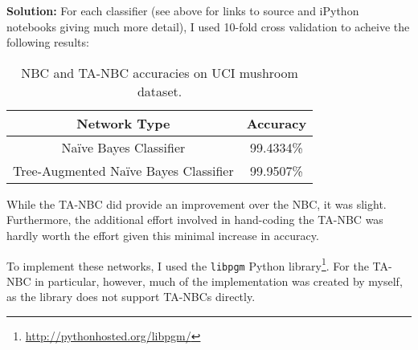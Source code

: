 \documentclass[11pt]{article}
\begin{document}
\begin{enumerate}
\textbf{Solution:} For each classifier (see above for links to source and iPython notebooks giving much more detail), I used 10-fold cross validation to acheive the following results:

\begin{table}[h]
\centering
\begin{tabular}{c|c}
Network Type & Accuracy \\
\hline
Na\"ive Bayes Classifier & 99.4334\% \\
Tree-Augmented Na\"ive Bayes Classifier & 99.9507\% \\
\end{tabular}
\caption{NBC and TA-NBC accuracies on UCI mushroom dataset.}
\label{fig:possible}
\end{table}

While the TA-NBC did provide an improvement over the NBC, it was slight. Furthermore, the additional effort involved in hand-coding the TA-NBC was hardly worth the effort given this minimal increase in accuracy.

To implement these networks, I used the \verb|libpgm| Python library\footnote{\url{http://pythonhosted.org/libpgm/}}. For the TA-NBC in particular, however, much of the implementation was created by myself, as the library does not support TA-NBCs directly.

\end{enumerate}
\end{document}
